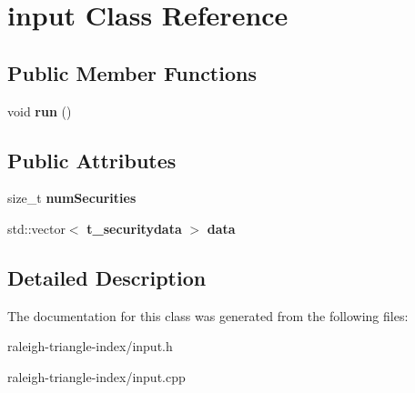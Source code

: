 \section{input Class Reference}
\label{classinput}
\subsection*{Public Member Functions}
\begin{DoxyCompactItemize}
\item 
void {\bfseries run} ()\label{classinput_a66b4f8871ed69b7b19e74158332cd10c}

\end{DoxyCompactItemize}
\subsection*{Public Attributes}
\begin{DoxyCompactItemize}
\item 
size\+\_\+t {\bfseries num\+Securities}\label{classinput_ab068464f56aecfd936ab32eb25e43daa}

\item 
std\+::vector$<$ {\bf t\+\_\+securitydata} $>$ {\bfseries data}\label{classinput_ad476519fcdcd20a942206978d605747f}

\end{DoxyCompactItemize}


\subsection{Detailed Description}


The documentation for this class was generated from the following files\+:\begin{DoxyCompactItemize}
\item 
raleigh-\/triangle-\/index/input.\+h\item 
raleigh-\/triangle-\/index/input.\+cpp\end{DoxyCompactItemize}
